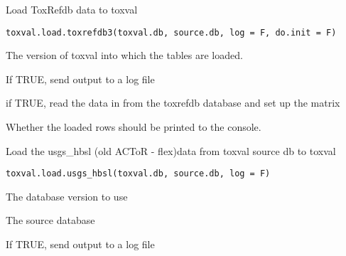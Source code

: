 \documentclass[letterpaper]{book}
\begin{document}
%
\begin{Description}\relax
Load ToxRefdb data to toxval
\end{Description}
%
\begin{Usage}
\begin{verbatim}
toxval.load.toxrefdb3(toxval.db, source.db, log = F, do.init = F)
\end{verbatim}
\end{Usage}
%
\begin{Arguments}
\begin{ldescription}
\item[\code{toxval.db}] The version of toxval into which the tables are loaded.

\item[\code{log}] If TRUE, send output to a log file

\item[\code{do.init}] if TRUE, read the data in from the toxrefdb database and set up the matrix

\item[\code{verbose}] Whether the loaded rows should be printed to the console.
\end{ldescription}
\end{Arguments}
%
\begin{Description}\relax
Load the usgs\_hbsl (old ACToR - flex)data  from toxval source db to toxval
\end{Description}
%
\begin{Usage}
\begin{verbatim}
toxval.load.usgs_hbsl(toxval.db, source.db, log = F)
\end{verbatim}
\end{Usage}
%
\begin{Arguments}
\begin{ldescription}
\item[\code{toxval.db}] The database version to use

\item[\code{source.db}] The source database

\item[\code{log}] If TRUE, send output to a log file
\end{ldescription}
\end{Arguments}
\end{document}
